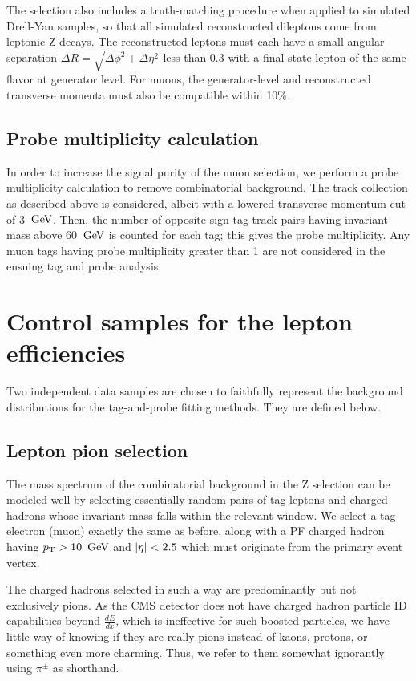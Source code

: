 The selection also includes a truth-matching procedure when applied to simulated Drell-Yan samples,
so that all simulated reconstructed dileptons come from leptonic Z decays.
The reconstructed leptons must each have a small angular separation $\Delta R = \sqrt{ \Delta\phi^{2} + \Delta\eta^{2} }$ 
less than 0.3 with a final-state lepton of the same flavor at generator level. For muons, the generator-level and reconstructed
transverse momenta must also be compatible within 10\%.

\subsection{Probe multiplicity calculation}
In order to increase the signal purity of the muon selection, we perform a probe multiplicity calculation to
remove combinatorial background. The track collection as described above is considered, albeit with a 
lowered transverse momentum cut of 3 $\,\text{Ge\hspace{-.08em}V}$. Then, the number of opposite sign tag-track pairs having invariant mass above
60 $\,\text{Ge\hspace{-.08em}V}$ is counted for each tag; this gives the probe multiplicity. Any muon tags having probe multiplicity
greater than 1 are not considered in the ensuing tag and probe analysis.

\section{Control samples for the lepton efficiencies}
Two independent data samples are chosen to faithfully represent the background distributions for the
tag-and-probe fitting methods. They are defined below.
\label{sec:tnpcontrol}

\subsection{Lepton pion selection}
The mass spectrum of the combinatorial background in the Z selection can be modeled well by selecting
essentially random pairs of tag leptons and charged hadrons whose invariant mass falls within the relevant window.
We select a tag electron (muon) exactly the same as before, along with a PF charged hadron having $p_{\mathrm{T}}>10~\,\text{Ge\hspace{-.08em}V}$ and $\lvert \eta \rvert<2.5$
which must originate from the primary event vertex.

The charged hadrons selected in such a way are predominantly but not exclusively pions.
As the CMS detector does not have charged hadron particle ID capabilities beyond $\frac{dE}{dx}$,
which is ineffective for such boosted particles, we have little way of knowing if they are really pions
instead of kaons, protons, or something even more charming.
Thus, we refer to them somewhat ignorantly using $\pi^{\pm}$ as shorthand.

